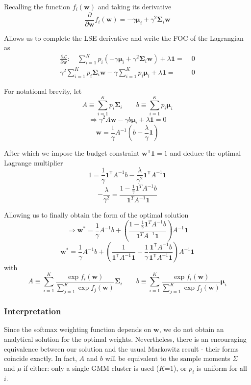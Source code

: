 Recalling the function $f_i(\mathbf{w})$ and taking its derivative
$$\frac{\partial}{\partial\mathbf{w}}f_i(\mathbf{w})=-\gamma\mathbf{\mu}_i+\gamma^2\mathbf{\Sigma}_i\mathbf{w}$$

Allows us to complete the LSE derivative and write the FOC of the Lagrangian as
\begin{align*}
  \frac{\partial\mathcal{L}}{\partial\mathbf{w}}:\quad\sum_{i=1}^{K}p_i(-\gamma\mathbf{\mu}_i+\gamma^2\mathbf{\Sigma}_i\mathbf{w})+\lambda\mathbf{1}=&\;0 \\
  \gamma^2\sum_{i=1}^{K}p_i\mathbf{\Sigma}_i\mathbf{w}-\gamma\sum_{i=1}^{K}p_i\mathbf{\mu}_i+\lambda\mathbf{1}=&\;0
\end{align*} 

For notational brevity, let
$$A\equiv\sum_{i=1}^{K}p_i\mathbf{\Sigma}_{i}\qquad b\equiv\sum_{i=1}^{K}p_i\mathbf{\mu}_i$$
$$\Longrightarrow \gamma^{2}A\mathbf{w}-\gamma b\mathbf{\mu}_{i}+\lambda\mathbf{1}=0$$
$$\mathbf{w}=\frac{1}{\gamma}A^{-1}(b-\frac{\lambda}{\gamma}\mathbf{1})$$

After which we impose the budget constraint $\mathbf{w^{\mathsf{T}}1}=1$ and deduce the optimal Lagrange multiplier
$$1=\frac{1}{\gamma}\mathbf{1}^{\mathsf{T}}A^{-1}b-\frac{\lambda}{\gamma^2}\mathbf{1}^{\mathsf{T}}A^{-1}\mathbf{1}$$
$$-\frac{\lambda}{\gamma^2}=\frac{1-\frac{1}{\gamma}\mathbf1^T A^{-1}b} {\mathbf1^T A^{-1}\mathbf1}$$

Allowing us to finally obtain the form of the optimal solution
$$\Longrightarrow\mathbf{w}^* = \frac{1}{\gamma} A^{-1} b + \left(\frac{1-\frac{1}{\gamma}\mathbf1^T A^{-1}b} {\mathbf1^T A^{-1}\mathbf1}\right) A^{-1} \mathbf{1}$$
$$\boxed{\mathbf{w}^* = \frac{1}{\gamma} A^{-1} b + \left(\frac{1}{\mathbf{1}^{\mathsf{T}} A^{-1} \mathbf{1}}- \frac{1}{\gamma}\frac{\mathbf{1}^{\mathsf{T}} A^{-1} b}{ \mathbf{1}^{\mathsf{T}} A^{-1} \mathbf{1}}\right) A^{-1} \mathbf{1}}$$
with
$$A\equiv\sum_{i=1}^{K} \frac{\exp f_i(\mathbf{w})}{\sum_{j=1}^{K} \exp f_j(\mathbf{w})} \mathbf{\Sigma}_{i}\qquad b\equiv \sum_{i=1}^{K} \frac{\exp f_i(\mathbf{w})}{\sum_{j=1}^{K} \exp f_j(\mathbf{w})} \mathbf{\mu}_i$$

\subsubsection{Interpretation}
Since the softmax weighting function depends on $\mathbf{w}$, we do not obtain an analytical solution for the optimal weights. Nevertheless, there is an encouraging equivalence between our solution and the usual Markowitz result - their forms coincide exactly. In fact, $A$ and $b$ will be equivalent to the sample moments $\Sigma$ and $\mu$ if either: only a single GMM cluster is used ($K$=1), or $p_i$ is uniform for all $i$.

